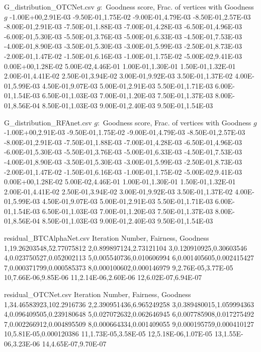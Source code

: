 \begin{filecontents*}{G_distribution_OTCNet.csv}
$g:$ Goodness score, Frac. of vertices with Goodness $g$
-1.00E+00,2.91E-03
-9.50E-01,1.75E-02
-9.00E-01,4.79E-03
-8.50E-01,2.57E-03
-8.00E-01,2.91E-03
-7.50E-01,1.88E-03
-7.00E-01,4.28E-03
-6.50E-01,4.96E-03
-6.00E-01,5.30E-03
-5.50E-01,3.76E-03
-5.00E-01,6.33E-03
-4.50E-01,7.53E-03
-4.00E-01,8.90E-03
-3.50E-01,5.30E-03
-3.00E-01,5.99E-03
-2.50E-01,8.73E-03
-2.00E-01,1.47E-02
-1.50E-01,6.16E-03
-1.00E-01,1.75E-02
-5.00E-02,9.41E-03
0.00E+00,1.28E-02
5.00E-02,4.46E-01
1.00E-01,1.30E-01
1.50E-01,1.32E-01
2.00E-01,4.41E-02
2.50E-01,3.94E-02
3.00E-01,9.92E-03
3.50E-01,1.37E-02
4.00E-01,5.99E-03
4.50E-01,9.07E-03
5.00E-01,2.91E-03
5.50E-01,1.71E-03
6.00E-01,1.54E-03
6.50E-01,1.03E-03
7.00E-01,1.20E-03
7.50E-01,1.37E-03
8.00E-01,8.56E-04
8.50E-01,1.03E-03
9.00E-01,2.40E-03
9.50E-01,1.54E-03
\end{filecontents*}

\begin{filecontents*}{G_distribution_RFAnet.csv}
$g:$ Goodness score, Frac. of vertices with Goodness $g$
-1.00E+00,2.91E-03
-9.50E-01,1.75E-02
-9.00E-01,4.79E-03
-8.50E-01,2.57E-03
-8.00E-01,2.91E-03
-7.50E-01,1.88E-03
-7.00E-01,4.28E-03
-6.50E-01,4.96E-03
-6.00E-01,5.30E-03
-5.50E-01,3.76E-03
-5.00E-01,6.33E-03
-4.50E-01,7.53E-03
-4.00E-01,8.90E-03
-3.50E-01,5.30E-03
-3.00E-01,5.99E-03
-2.50E-01,8.73E-03
-2.00E-01,1.47E-02
-1.50E-01,6.16E-03
-1.00E-01,1.75E-02
-5.00E-02,9.41E-03
0.00E+00,1.28E-02
5.00E-02,4.46E-01
1.00E-01,1.30E-01
1.50E-01,1.32E-01
2.00E-01,4.41E-02
2.50E-01,3.94E-02
3.00E-01,9.92E-03
3.50E-01,1.37E-02
4.00E-01,5.99E-03
4.50E-01,9.07E-03
5.00E-01,2.91E-03
5.50E-01,1.71E-03
6.00E-01,1.54E-03
6.50E-01,1.03E-03
7.00E-01,1.20E-03
7.50E-01,1.37E-03
8.00E-01,8.56E-04
8.50E-01,1.03E-03
9.00E-01,2.40E-03
9.50E-01,1.54E-03
\end{filecontents*}

\begin{filecontents*}{residual_BTCAlphaNet.csv}
Iteration Number, Fairness, Goodness
1,19.26203548,52.77075812
2,0.899897124,2.73121104
3,0.120910925,0.30603546
4,0.023750527,0.052002113
5,0.005540736,0.010606994
6,0.001405605,0.002415427
7,0.000371799,0.000585373
8,0.000100602,0.000146979
9,2.76E-05,3.77E-05
10,7.66E-06,9.85E-06
11,2.14E-06,2.60E-06
12,6.02E-07,6.94E-07
\end{filecontents*}

\begin{filecontents*}{residual_OTCNet.csv}
Iteration Number, Fairness, Goodness
1,34.46583923,102.2916736
2,2.390951436,6.965249258
3,0.389480015,1.059994363
4,0.096409505,0.239180648
5,0.027072632,0.062646945
6,0.007785908,0.017275492
7,0.002266912,0.004895509
8,0.000664334,0.001409055
9,0.000195759,0.000410127
10,5.81E-05,0.000120386
11,1.73E-05,3.58E-05
12,5.18E-06,1.07E-05
13,1.55E-06,3.23E-06
14,4.65E-07,9.70E-07
\end{filecontents*}

